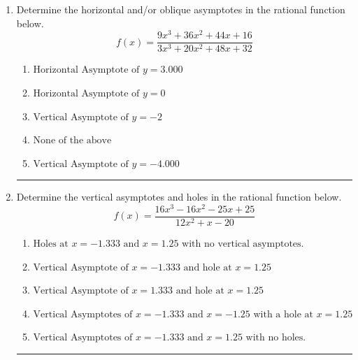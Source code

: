 \documentclass[14pt]{extbook}
\newcommand{\litem}[1]{\item#1\hspace*{-1cm}\rule{\textwidth}{0.4pt}}
\begin{document}
\begin{enumerate}
\litem{
Determine the horizontal and/or oblique asymptotes in the rational function below.\[ f(x) = \frac{9x^{3} +36 x^{2} +44 x + 16}{3x^{3} +20 x^{2} +48 x + 32} \]\begin{enumerate}[label=\Alph*.]
\item \( \text{Horizontal Asymptote of } y = 3.000  \)
\item \( \text{Horizontal Asymptote of } y = 0  \)
\item \( \text{Vertical Asymptote of } y = -2  \)
\item \( \text{None of the above} \)
\item \( \text{Vertical Asymptote of } y = -4.000  \)

\end{enumerate} }
\litem{
Determine the vertical asymptotes and holes in the rational function below.\[ f(x) = \frac{16x^{3} -16 x^{2} -25 x + 25}{12x^{2} +x -20} \]\begin{enumerate}[label=\Alph*.]
\item \( \text{Holes at } x = -1.333 \text{ and } x = 1.25 \text{ with no vertical asymptotes.} \)
\item \( \text{Vertical Asymptote of } x = -1.333 \text{ and hole at } x = 1.25 \)
\item \( \text{Vertical Asymptote of } x = 1.333 \text{ and hole at } x = 1.25 \)
\item \( \text{Vertical Asymptotes of } x = -1.333 \text{ and } x = -1.25 \text{ with a hole at } x = 1.25 \)
\item \( \text{Vertical Asymptotes of } x = -1.333 \text{ and } x = 1.25 \text{ with no holes.} \)


\end{enumerate}}
\end{enumerate}
\end{document}
